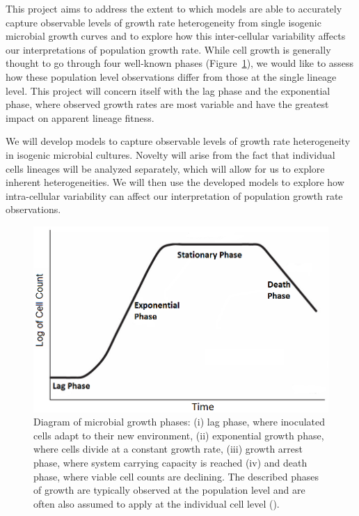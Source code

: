 \documentclass{bioinfo}
\begin{document}
This project aims to address the extent to which models are able to accurately capture observable levels of growth rate heterogeneity from single isogenic microbial growth curves and to explore how this inter-cellular variability affects our interpretations of population growth rate. While cell growth is generally thought to go through four well-known phases (Figure~\ref{fig:GrowthPhases}), we would like to assess how these population level observations differ from those at the single lineage level. This project will concern itself with the lag phase and the exponential phase, where observed growth rates are most variable and have the greatest impact on apparent lineage fitness. 

We will develop models to capture observable levels of growth rate heterogeneity in isogenic microbial cultures. Novelty will arise from the fact that individual cells lineages will be analyzed separately, which will allow for us to explore inherent heterogeneities. We will then use the developed models to explore how intra-cellular variability can affect our interpretation of population growth rate observations.

\vspace{+2em}
\begin{figure}[H]
\includegraphics[width=1\linewidth]{GrowthPhases.png}
\caption{Diagram of microbial growth phases: (i) lag phase, where inoculated cells adapt to their new environment, (ii) exponential growth phase, where cells divide at a constant growth rate, (iii) growth arrest phase, where system carrying capacity is reached (iv) and death phase, where viable cell counts are declining. The described phases of growth are typically observed at the population level and are often also assumed to apply at the individual cell level (\citealp{Baranyi02}).}
\label{fig:GrowthPhases}
\vspace{-3em}
\end{figure}
\end{document}
